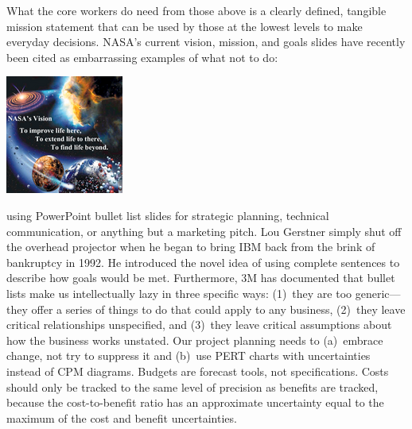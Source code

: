 \documentclass{tufte-handout}
\begin{document}
What%
the core workers do need from those above is a clearly defined,
tangible mission statement that can be used by those at the lowest levels
to make everyday decisions.
NASA's current vision, mission, and goals slides have recently been
cited%
as embarrassing examples of what not to do:
\vfill
\begin{center}
  \includegraphics[width=0.5\linewidth]{nasa_vision_sm}
\end{center}
\vfill
\newpage

 using PowerPoint bullet list slides for strategic
planning, technical communication, or anything but a marketing pitch.
Lou Gerstner simply shut off the overhead projector when he
began to bring IBM back from the brink of bankruptcy in 1992.
He introduced the novel idea of using complete sentences to describe
how goals would be met.%
Furthermore, 3M has documented%
that bullet lists make us intellectually
lazy in three specific ways: (1)~they are too generic---they offer a
series of things to do that could apply to any business, (2)~they leave
critical relationships unspecified, and (3)~they leave critical
assumptions about how the business works unstated.
Our project planning needs to (a)~embrace change, not try
to suppress it and (b)~use PERT charts with uncertainties
instead of CPM diagrams.%
Budgets are forecast tools, not specifications.
Costs should only be tracked to the same level of precision as benefits
are tracked, because the cost-to-benefit ratio has an approximate
uncertainty equal to the maximum of the cost and benefit uncertainties.%
\end{document}
